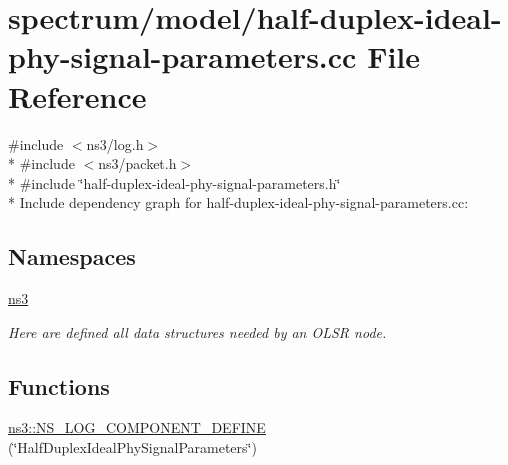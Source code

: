 \hypertarget{half-duplex-ideal-phy-signal-parameters_8cc}{}\section{spectrum/model/half-\/duplex-\/ideal-\/phy-\/signal-\/parameters.cc File Reference}
\label{half-duplex-ideal-phy-signal-parameters_8cc}
{\ttfamily \#include $<$ns3/log.\+h$>$}\\*
{\ttfamily \#include $<$ns3/packet.\+h$>$}\\*
{\ttfamily \#include \char`\"{}half-\/duplex-\/ideal-\/phy-\/signal-\/parameters.\+h\char`\"{}}\\*
Include dependency graph for half-\/duplex-\/ideal-\/phy-\/signal-\/parameters.cc\+:
\subsection*{Namespaces}
\begin{DoxyCompactItemize}
\item 
 \hyperlink{namespacens3}{ns3}
\begin{DoxyCompactList}\small\item\em Here are defined all data structures needed by an O\+L\+SR node. \end{DoxyCompactList}\end{DoxyCompactItemize}
\subsection*{Functions}
\begin{DoxyCompactItemize}
\item 
\hyperlink{namespacens3_afad24108f005eb3415dfc6b88e172a9e}{ns3\+::\+N\+S\+\_\+\+L\+O\+G\+\_\+\+C\+O\+M\+P\+O\+N\+E\+N\+T\+\_\+\+D\+E\+F\+I\+NE} (\char`\"{}Half\+Duplex\+Ideal\+Phy\+Signal\+Parameters\char`\"{})
\end{DoxyCompactItemize}
